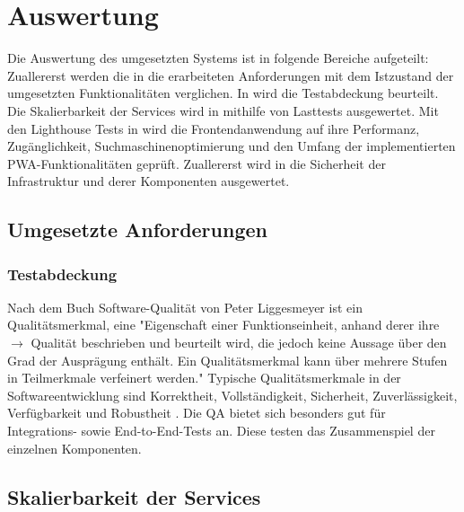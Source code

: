 \chapter{Auswertung}
\label{chap:auswertung}
Die Auswertung des umgesetzten Systems ist in folgende Bereiche aufgeteilt:
Zuallererst werden die in  die erarbeiteten Anforderungen
mit dem Istzustand der umgesetzten Funktionalitäten verglichen. In 
wird die Testabdeckung beurteilt. Die Skalierbarkeit der Services wird in 
mithilfe von Lasttests ausgewertet. Mit den Lighthouse Tests in  wird die Frontendanwendung
auf ihre Performanz, Zugänglichkeit, Suchmaschinenoptimierung und den Umfang der implementierten PWA-Funktionalitäten geprüft.
Zuallererst wird in  die Sicherheit der Infrastruktur und derer Komponenten ausgewertet.

\section{Umgesetzte Anforderungen}
\label{sec:umgesetzteanforderungen}

\subsection{Testabdeckung}
\label{subsec:testabdeckung}


Nach dem Buch Software-Qualität von Peter Liggesmeyer
ist ein Qualitätsmerkmal, eine "Eigenschaft einer Funktionseinheit, anhand derer ihre \(\rightarrow\)
Qualität beschrieben und beurteilt wird, die jedoch keine Aussage über
den Grad der Ausprägung enthält. Ein Qualitätsmerkmal kann über mehrere Stufen in Teilmerkmale
verfeinert werden."\cite[S. 515]{SoftwareQualitaet} Typische Qualitätsmerkmale in der Softwareentwicklung
sind Korrektheit, Vollständigkeit, Sicherheit, Zuverlässigkeit, Verfügbarkeit und Robustheit \cite[S. 5]{SoftwareQualitaet}.
Die QA bietet sich besonders gut für Integrations- sowie End-to-End-Tests an. Diese testen
das Zusammenspiel der einzelnen Komponenten.




\section{Skalierbarkeit der Services}
\label{sec:skalierbarkeitderservices}

